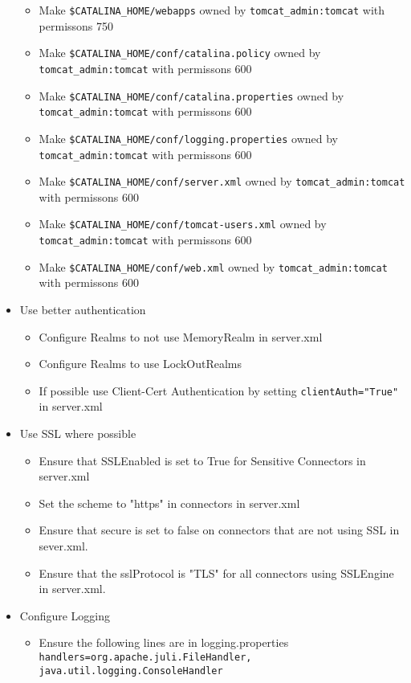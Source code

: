 \begin{itemize}
\begin{itemize}
		\item Make \lstinline|$CATALINA_HOME/webapps| owned by \lstinline|tomcat_admin:tomcat| with permissons 750
		\item Make \lstinline|$CATALINA_HOME/conf/catalina.policy| owned by \lstinline|tomcat_admin:tomcat| with permissons 600
		\item Make \lstinline|$CATALINA_HOME/conf/catalina.properties| owned by \lstinline|tomcat_admin:tomcat| with permissons 600
		\item Make \lstinline|$CATALINA_HOME/conf/logging.properties| owned by \lstinline|tomcat_admin:tomcat| with permissons 600
		\item Make \lstinline|$CATALINA_HOME/conf/server.xml| owned by \lstinline|tomcat_admin:tomcat| with permissons 600
		\item Make \lstinline|$CATALINA_HOME/conf/tomcat-users.xml| owned by \lstinline|tomcat_admin:tomcat| with permissons 600
		\item Make \lstinline|$CATALINA_HOME/conf/web.xml| owned by \lstinline|tomcat_admin:tomcat| with permissons 600
		\end{itemize}
	\item Use better authentication
		\begin{itemize}
		\item Configure Realms to not use MemoryRealm in server.xml
		\item Configure Realms to use LockOutRealms
		\item If possible use Client-Cert Authentication by setting \lstinline|clientAuth="True"| in server.xml
		\end{itemize}
	\item Use SSL where possible
		\begin{itemize}
		\item Ensure that SSLEnabled is set to True for Sensitive Connectors in server.xml
		\item Set the scheme to "https" in connectors in server.xml
		\item Ensure that secure is set to false on connectors that are not using SSL in sever.xml.
		\item Ensure that the sslProtocol is "TLS" for all connectors using SSLEngine in server.xml.
		\end{itemize}
	\item Configure Logging
		\begin{itemize}
		\item Ensure the following lines are in logging.properties \lstinline|handlers=org.apache.juli.FileHandler, java.util.logging.ConsoleHandler|

\end{itemize}
\end{itemize}
